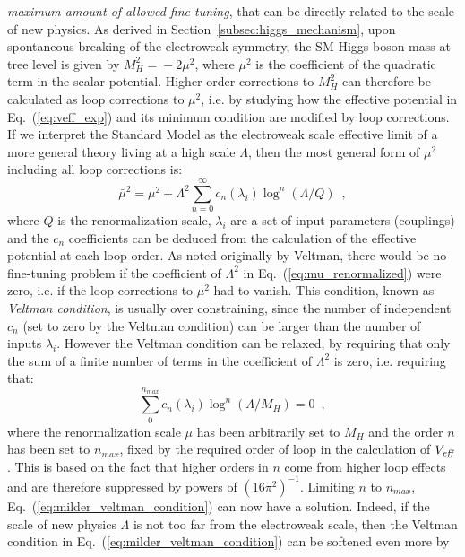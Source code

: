 \documentclass[12pt,prd,onecolumn,aps,floats,superscriptaddress,floatfix,nofootinbib]{revtex4-2}
\begin{document}
\emph{maximum amount of allowed fine-tuning}, that can be directly
related to the scale of new physics. As derived in
Section~\ref{subsec:higgs_mechanism}, upon spontaneous breaking of the
electroweak symmetry, the SM Higgs boson mass at tree level is given
by $M_H^2\!=\!-2\mu^2$, where $\mu^2$ is the coefficient of the
quadratic term in the scalar potential. Higher order corrections to
$M_H^2$ can therefore be calculated as loop corrections to $\mu^2$,
i.e. by studying how the effective potential in
Eq.~(\ref{eq:veff_exp}) and its minimum condition are modified by loop
corrections.  If we interpret the Standard Model as the electroweak
scale effective limit of a more general theory living at a high scale
$\Lambda$, then the most general form of $\mu^2$ including all loop
corrections is:
\begin{equation}
\label{eq:mu_renormalized}
\bar\mu^2=\mu^2+\Lambda^2\sum_{n=0}^{\infty}c_n(\lambda_i)\log^n(\Lambda/Q)
\,\,\,,
\end{equation}
where $Q$ is the renormalization scale, $\lambda_i$ are a set of input
parameters (couplings) and the $c_n$ coefficients can be deduced from
the calculation of the effective potential at each loop order. As
noted originally by Veltman, there would be no fine-tuning problem if
the coefficient of $\Lambda^2$ in Eq.~(\ref{eq:mu_renormalized}) were
zero, i.e. if the loop corrections to $\mu^2$ had to vanish. This
condition, known as \emph{Veltman condition}, is usually over constraining,
since the number of independent $c_n$ (set to zero by the Veltman
condition) can be larger than the number of inputs
$\lambda_i$. However the Veltman condition can be relaxed, by
requiring that only the sum of a finite number of terms in the
coefficient of $\Lambda^2$ is zero, i.e. requiring that:
\begin{equation}
\label{eq:milder_veltman_condition}
\sum_0^{n_{max}}c_n(\lambda_i)\log^n(\Lambda/M_H)=0\,\,\,,
\end{equation}
where the renormalization scale $\mu$ has been arbitrarily set to
$M_H$ and the order $n$ has been set to $n_{max}$, fixed by the
required order of loop in the calculation of $V_{\it eff}$. This is based
on the fact that higher orders in $n$ come from higher loop effects
and are therefore suppressed by powers of $(16\pi^2)^{-1}$. Limiting
$n$ to $n_{max}$, Eq.~(\ref{eq:milder_veltman_condition}) can now have
a solution. Indeed, if the scale of new physics $\Lambda$ is not too
far from the electroweak scale, then the Veltman condition in
Eq.~(\ref{eq:milder_veltman_condition}) can be softened even more by
\end{document}
